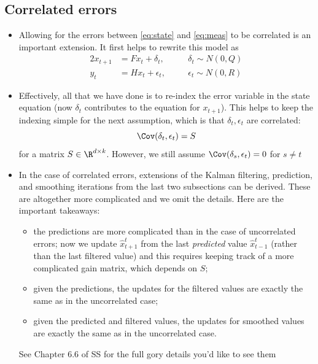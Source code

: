 \documentclass{article}
\begin{document}
\subsection{Correlated errors} 

\begin{itemize}
\item Allowing for the errors between \eqref{eq:state} and \eqref{eq:meas} to be
  correlated is an important extension. It first helps to rewrite this model as 
  \begin{alignat*}{2}
  x_{t+1} &= F x_t + \delta_t, \quad &&\delta_t \sim N(0, Q) \\
  y_t &= H x_t + \epsilon_t, \quad &&\epsilon_t \sim N(0, R) 
  \end{alignat*}  

\item Effectively, all that we have done is to re-index the error variable in
  the state equation (now $\delta_t$ contributes to the equation for $x_{t+1}$).
  This helps to keep the indexing simple for the next assumption, which is that
  $\delta_t,\epsilon_t$ are correlated:
  \[
  \Cov(\delta_t, \epsilon_t) = S
  \]
  for a matrix $S \in \R^{d \times k}$. However, we still assume $\Cov(\delta_s, 
  \epsilon_t) = 0$ for $s \not= t$

\item In the case of correlated errors, extensions of the Kalman filtering,
  prediction, and smoothing iterations from the last two subsections can be
  derived. These are altogether more complicated and we omit the details. Here
  are the important takeaways: 
  \begin{itemize}
  \item the predictions are more complicated than in the case of uncorrelated
    errors; now we update $\hat{x}_{t+1}^t$ from the last \emph{predicted} value
    $\hat{x}_{t-1}^t$ (rather than the last filtered value) and this requires
    keeping track of a more complicated gain matrix, which depends on $S$;  

  \item given the predictions, the updates for the filtered values are exactly
    the same as in the uncorrelated case;

\item given the predicted and filtered values, the updates for smoothed values
  are exactly the same as in the uncorrelated case. 
  \end{itemize}
  See Chapter 6.6 of SS for the full gory details you'd like to see them
\end{itemize}
\end{document}
